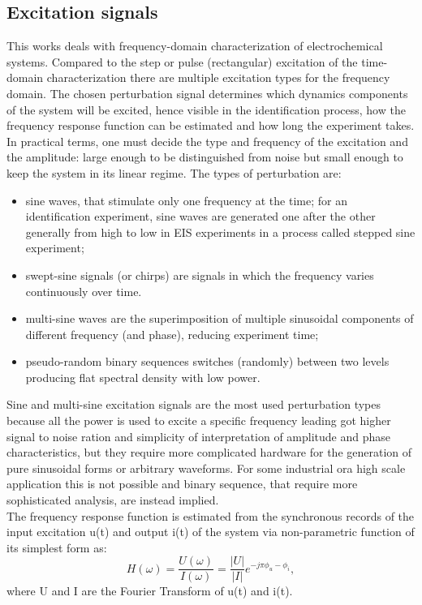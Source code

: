 \subsection{Excitation signals}
This works deals with frequency-domain characterization of electrochemical systems. Compared to the step or pulse (rectangular) excitation of the time-domain characterization there are multiple excitation types for the frequency domain. The chosen perturbation signal determines which dynamics components of the system will be excited, hence visible in the identification process, how the frequency response function can be estimated and how long the experiment takes. In practical terms, one must decide the type and frequency of the excitation and the amplitude: large enough to be distinguished from noise but small enough to keep the system in its linear regime. The types of perturbation are:
\begin{itemize}
    \item sine waves, that stimulate only one frequency at the time; for an identification experiment, sine waves are generated one after the other generally from high to low in EIS experiments in a process called stepped sine experiment;
    \item swept-sine signals (or chirps) are signals in which the frequency varies continuously over time.
    \item multi-sine waves are the superimposition of multiple sinusoidal components of different frequency (and phase), reducing experiment time;
    \item pseudo-random binary sequences switches (randomly) between two levels producing flat spectral density with low power.
\end{itemize}
Sine and multi-sine excitation signals are the most used perturbation types because all the power is used to excite a specific frequency leading got higher signal to noise ration and simplicity of interpretation of amplitude and phase characteristics, but they require more complicated hardware for the generation of pure sinusoidal forms or arbitrary waveforms. For some industrial ora high scale application this is not possible and binary sequence, that require more sophisticated analysis, are instead implied.\\
The frequency response function is estimated from the synchronous records of the input excitation u(t) and output i(t) of the system via non-parametric function of its simplest form as:
$$
H(\omega) = \frac{U(\omega)}{I(\omega)}=\frac{|U|}{|I|}e^{-j\pi\phi_u-\phi_i},
$$
where U and I are the Fourier Transform of u(t) and i(t).
